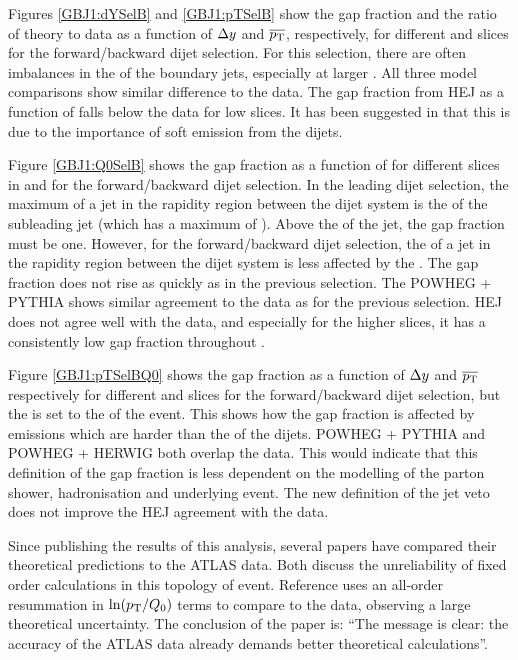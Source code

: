  
Figures \ref{GBJ1:dYSelB} and \ref{GBJ1:pTSelB} show the gap fraction and the ratio of theory to data as a function of $\mbox{$\Delta y$}{}$ and $\mbox{$\overline{p_{\rm T}}$}{}$, respectively, for different \ptb{} and \dy{} slices for the forward/backward dijet selection.
For this selection, there are often imbalances in the \pt{} of the boundary jets, especially at larger \ptb{}.
All three model comparisons show similar difference to the data. 
The gap fraction from HEJ as a function of \dy{} falls below the data for low \ptb{} slices. 
It has been suggested in \cite{ref:Anderson1} that this is due to the importance of soft emission from the dijets.

Figure \ref{GBJ1:Q0SelB} shows the gap fraction as a function of \qz{} for different slices in \dy{} and \ptb{} for the forward/backward dijet selection.
In the leading \pt{} dijet selection, the maximum \pt{} of a jet in the rapidity region between the dijet system is the \pt{} of the subleading jet (which has a maximum \pt{} of \ptb{}).
Above the \ptb{} of the jet, the gap fraction must be one.
However, for the forward/backward dijet selection, the \pt{} of a jet in the rapidity region between the dijet system is less affected by the \ptb{}.
The gap fraction does not rise as quickly as in the previous selection.
The POWHEG + PYTHIA  shows similar agreement to the data as for the previous selection.
HEJ does not agree well with the data, and especially for the higher \dy{} slices, it has a consistently low gap fraction throughout \qz{}. 

Figure \ref{GBJ1:pTSelBQ0} shows the gap fraction as a function of $\mbox{$\Delta y$}{}$ and $\mbox{$\overline{p_{\rm T}}$}{}$ respectively for different \ptb{} and \dy{} slices for the forward/backward dijet selection, but the \qz{} is set to the \ptb{} of the event. 
This shows how the gap fraction is affected by emissions which are harder than the \ptb{} of the  dijets. 
POWHEG + PYTHIA and POWHEG + HERWIG both overlap the data.
This would indicate that this definition of the gap fraction is less dependent on the modelling of the parton shower, hadronisation and underlying event.
The new definition of the jet veto does not improve the HEJ agreement with the data.


Since publishing the results of this analysis, several papers \cite{ref:Anderson1,ref:JeffNew} have compared  their theoretical predictions to the ATLAS data. 
Both discuss the unreliability of fixed order calculations in this topology of event.
Reference \cite{ref:JeffNew} uses an all-order resummation in $\ln(\mbox{$p_{\rm T}$}{}/\mbox{$Q_0$}{})$ terms to compare to the data, observing a large theoretical uncertainty. 
The conclusion of the paper is: ``The message is clear: the accuracy of the ATLAS data already demands better theoretical calculations''.


